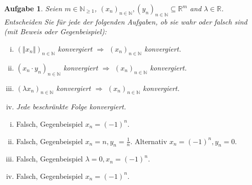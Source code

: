 \documentclass[a4paper, 20]{exam}
\newtheorem{ex}{Aufgabe}
\newcommand\RR{\mathbb{R}}
\newcommand\NN{\mathbb{N}}
\begin{document}
\begin{ex}
Seien $m\in \NN_{\geq 1}$, $(x_n)_{n\in \NN}, (y_n)_{n\in \NN} \subseteq \RR^m$ and $\lambda \in \RR$. Entscheiden Sie f\"ur jede der folgenden Aufgaben, ob sie wahr oder falsch sind (mit Beweis oder Gegenbeispiel):

\begin{enumerate}[i.)]
\item
$(\Vert x_n \Vert)_{n \in \NN}$ konvergiert $\Longrightarrow$ $(x_n)_{n\in \NN}$ konvergiert.

\item
$(x_n\cdot y_n)_{n\in \NN}$ konvergiert $\Longrightarrow$  $(x_n)_{n\in \NN}$ konvergiert.

\item
$(\lambda x_n)_{n\in \NN}$ konvergiert $\Longrightarrow$  $(x_n)_{n\in \NN}$ konvergiert.

\item
Jede beschr\"ankte Folge konvergiert.

\end{enumerate}
\end{ex}
\begin{solution}
\begin{enumerate}[i.)]
\item
Falsch, Gegenbeispiel $x_n=(-1)^n$.
\item
Falsch, Gegenbeispiel $x_n = n, y_n= \frac{1}{n}$. Alternativ $x_n=(-1)^n, y_n=0$.
\item
Falsch, Gegenbeispiel $\lambda = 0, x_n=(-1)^n$.
\item
Falsch, Gegenbeispiel $x_n= (-1)^n$.
\end{enumerate}
\end{solution}
\end{document}
